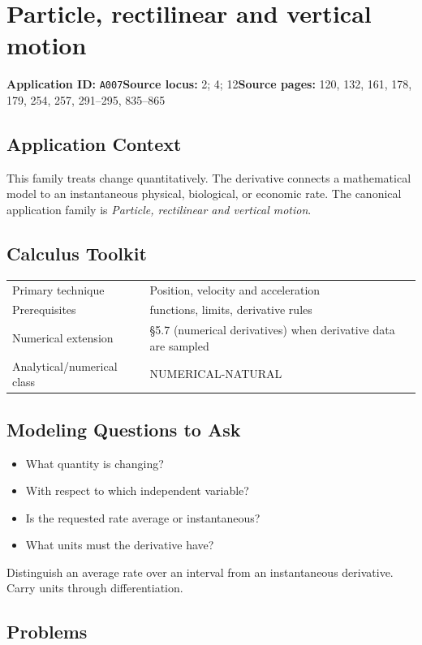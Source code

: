 \documentclass[11pt]{book}
\newcommand{\pid}[1]{\texttt{#1}}
\begin{document}
\chapter{Particle, rectilinear and vertical motion}\label{app:A007}
\textbf{Application ID:} \pid{A007}\quad \textbf{Source locus:} 2; 4; 12\quad \textbf{Source pages:} 120, 132, 161, 178, 179, 254, 257, 291–295, 835–865
\section*{Application Context}
This family treats change quantitatively. The derivative connects a mathematical model to an instantaneous physical, biological, or economic rate. The canonical application family is \emph{Particle, rectilinear and vertical motion}.
\section*{Calculus Toolkit}
\begin{tabularx}{\textwidth}{@{}lX@{}}\toprule
Primary technique & Position, velocity and acceleration \\
Prerequisites & functions, limits, derivative rules \\
Numerical extension & §5.7 (numerical derivatives) when derivative data are sampled \\
Analytical/numerical class & NUMERICAL-NATURAL \\
\bottomrule\end{tabularx}
\section*{Modeling Questions to Ask}\begin{itemize}
\item What quantity is changing?
\item With respect to which independent variable?
\item Is the requested rate average or instantaneous?
\item What units must the derivative have?
\end{itemize}
\begin{errorbox}Distinguish an average rate over an interval from an instantaneous derivative. Carry units through differentiation.\end{errorbox}
\section*{Problems}
\end{document}

